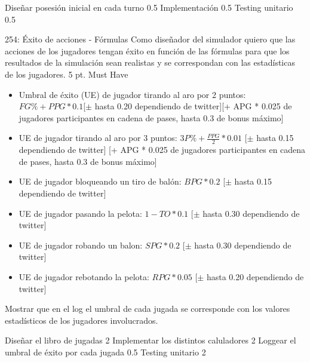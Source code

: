 \begin{taskstable}
 \task
 {Diseñar posesión inicial en cada turno}
 {0.5}
 \task
 {Implementación}
 {0.5}
 \task
 {Testing unitario}
 {0.5}
\end{taskstable}

\vspace{1cm}


\sprintstory
{254: Éxito de acciones - Fórmulas}
{Como diseñador del simulador quiero que las acciones de los jugadores tengan éxito en función de las fórmulas para que los resultados de la simulación sean realistas y se correspondan con las estadísticas de los jugadores.}
{5 pt.}
{Must Have}
{\begin{itemize}
    \item Umbral de éxito (UE) de jugador tirando al aro por 2 puntos: $FG\% + PPG*0.1 $[$\pm$ hasta 0.20 dependiendo de twitter][+ APG * 0.025 de jugadores participantes en cadena de pases, hasta 0.3 de bonus máximo] 
    \item UE de jugador tirando al aro por 3 puntos: $3P\% + \frac{PPG}{2}* 0.01$ [$\pm$ hasta 0.15 dependiendo de twitter] [+ APG * 0.025 de jugadores participantes en cadena de pases, hasta 0.3 de bonus máximo]
    \item UE de jugador bloqueando un tiro de balón: $BPG * 0.2$ [$\pm$ hasta 0.15 dependiendo de twitter]
    \item UE de jugador pasando la pelota: $1 - TO * 0.1$ [$\pm$ hasta 0.30 dependiendo de twitter]
    \item UE de jugador robando un balon: $SPG * 0.2$ [$\pm$ hasta 0.30 dependiendo de twitter]
    \item UE de jugador rebotando la pelota: $RPG * 0.05$ [$\pm$ hasta 0.20 dependiendo de twitter]
\end{itemize}}
{Mostrar que en el log el umbral de cada jugada se corresponde con los valores estadísticos de los jugadores involucrados.}

\begin{taskstable}
 \task
 {Diseñar el libro de jugadas}
 {2}
 \task
 {Implementar los distintos caluladores}
 {2}
 \task
 {Loggear el umbral de éxito por cada jugada}
 {0.5}
 \task
 {Testing unitario}
 {2}
\end{taskstable}

\vspace{1cm}


